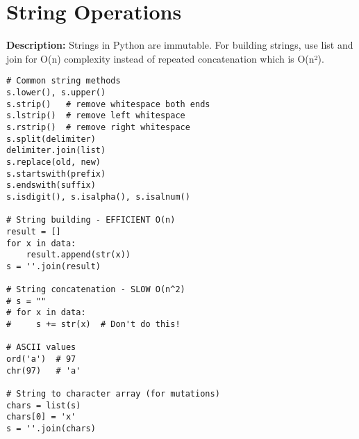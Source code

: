 \section{String Operations}

\textbf{Description:} Strings in Python are immutable. For building strings, use list and join for O(n) complexity instead of repeated concatenation which is O(n²).

\begin{lstlisting}
# Common string methods
s.lower(), s.upper()
s.strip()   # remove whitespace both ends
s.lstrip()  # remove left whitespace
s.rstrip()  # remove right whitespace
s.split(delimiter)
delimiter.join(list)
s.replace(old, new)
s.startswith(prefix)
s.endswith(suffix)
s.isdigit(), s.isalpha(), s.isalnum()

# String building - EFFICIENT O(n)
result = []
for x in data:
    result.append(str(x))
s = ''.join(result)

# String concatenation - SLOW O(n^2)
# s = ""
# for x in data:
#     s += str(x)  # Don't do this!

# ASCII values
ord('a')  # 97
chr(97)   # 'a'

# String to character array (for mutations)
chars = list(s)
chars[0] = 'x'
s = ''.join(chars)
\end{lstlisting}

